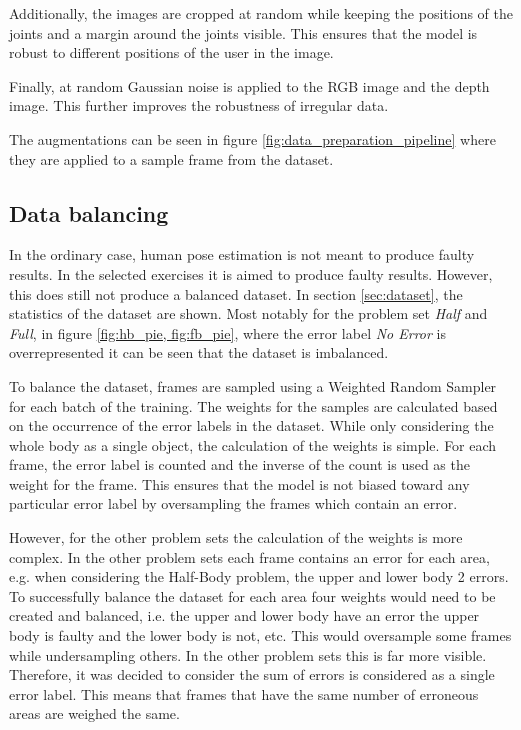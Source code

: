 Additionally, the images are cropped at random while keeping the positions of the joints and a margin around the joints visible. This ensures that the model is robust to different positions of the user in the image. 

Finally, at random Gaussian noise is applied to the RGB image and the depth image. This further improves the robustness of irregular data.

The augmentations can be seen in figure \ref{fig:data_preparation_pipeline} where they are applied to a sample frame from the dataset.

\subsection{Data balancing}

In the ordinary case, human pose estimation is not meant to produce faulty results. In the selected exercises it is aimed to produce faulty results. However, this does still not produce a balanced dataset. In section \ref{sec:dataset}, the statistics of the dataset are shown. Most notably for the problem set \textit{Half} and \textit{Full}, in figure \ref{fig:hb_pie, fig:fb_pie}, where the error label \textit{No Error} is overrepresented it can be seen that the dataset is imbalanced.

To balance the dataset, frames are sampled using a Weighted Random Sampler for each batch of the training. The weights for the samples are calculated based on the occurrence of the error labels in the dataset. While only considering the whole body as a single object, the calculation of the weights is simple. For each frame, the error label is counted and the inverse of the count is used as the weight for the frame. This ensures that the model is not biased toward any particular error label by oversampling the frames which contain an error.

However, for the other problem sets the calculation of the weights is more complex. In the other problem sets each frame contains an error for each area, e.g. when considering the Half-Body problem, the upper and lower body 2 errors. To successfully balance the dataset for each area four weights would need to be created and balanced, i.e. the upper and lower body have an error the upper body is faulty and the lower body is not, etc. This would oversample some frames while undersampling others. In the other problem sets this is far more visible. Therefore, it was decided to consider the sum of errors is considered as a single error label. This means that frames that have the same number of erroneous areas are weighed the same.
